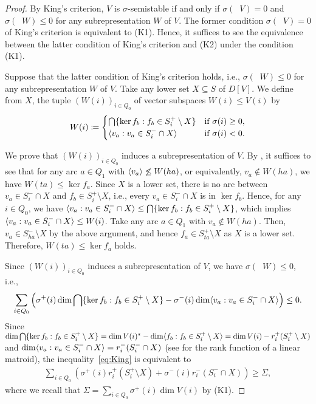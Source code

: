 \documentclass[a4paper,11pt]{article}
\numberwithin{equation}{section}
\DeclareMathOperator{\dimv}{\underline{dim}}
\DeclarePairedDelimiter{\spnn}{\langle}{\rangle}
\begin{document}
\begin{proof}
By King's criterion,
$V$ is $\sigma$-semistable if and only if
$\sigma (\dimv V) = 0$ and $\sigma (\dimv W) \leq 0$ for any subrepresentation $W$ of $V$.
The former condition $\sigma (\dimv V) = 0$ of King's criterion is equivalent to (K1).
Hence, it suffices to see the equivalence between
the latter condition of King's criterion and (K2)
under the condition (K1).

Suppose that the latter condition of King's criterion holds, i.e., $\sigma (\dimv W) \leq 0$ for any subrepresentation $W$ of $V$.
Take any lower set $X \subseteq S$ of $D[V]$.
We define from $X$, the tuple $(W(i))_{i \in Q_0}$ of vector subspaces $W(i) \leq V(i)$ by
\begin{align}
    W(i) \coloneqq
    \begin{cases}
        \bigcap \{ \ker f_b : f_b \in S_i^+ \setminus X \} & \text{if $\sigma(i) \geq 0$},\\
        \spnn{v_a : v_a \in S_i^- \cap X} & \text{if $\sigma(i) < 0$}.
    \end{cases}
\end{align}

We prove that $(W(i))_{i \in Q_0}$ induces a subrepresentation of $V$.
By ,
it suffices to see that for any arc $a \in Q_1$ with $\spnn{v_a} \not\leq W(ha)$, or equivalently, $v_a \notin W(ha)$,
we have $W(ta) \leq \ker f_a$.
Since $X$ is a lower set,
there is no arc between $v_a \in S_i^- \cap X$ and $f_b \in S_i^+ \setminus X$,
i.e., every $v_a \in S_i^- \cap X$ is in $\ker f_b$.
Hence, for any $i \in Q_0$, we have $\spnn{v_a : v_a \in S_i^- \cap X} \leq \bigcap \{ \ker f_b : f_b \in S_i^+ \setminus X \}$,
which implies $\spnn{v_a : v_a \in S_i^- \cap X} \leq W(i)$.
Take any arc $a \in Q_1$ with $v_a \notin W(ha)$.
Then, $v_a \in S_{ha}^- \setminus X$ by the above argument,
and hence $f_a \in S_{ta}^+ \setminus X$ as $X$ is a lower set.
Therefore, $W(ta) \leq \ker f_a$ holds.

Since $(W(i))_{i \in Q_0}$ induces a subrepresentation of $V$,
we have $\sigma(\dimv W) \leq 0$,
i.e.,
\begin{align}\label{eq:King}
    \sum_{i \in Q_0} \left( \sigma^+(i) \dim \bigcap \{ \ker f_b : f_b \in S_i^+ \setminus X \} - \sigma^-(i) \dim \spnn{v_a : v_a \in S_i^- \cap X} \right) \leq 0.
\end{align}
Since
$\dim \bigcap \{ \ker f_b : f_b \in S_i^+ \setminus X \} = \dim V(i)^* - \dim \spnn{f_b : f_b \in S_i^+ \setminus X} = \dim V(i) - r_i^+(S_i^+ \setminus X)$
and $\dim \spnn{v_a : v_a \in S_i^- \cap X} = r_i^-(S_i^- \cap X)$ (see  for the rank function of a linear matroid),
the inequality~\eqref{eq:King} is equivalent to
\begin{align}\label{eq:K2}
    \sum_{i \in Q_0}\left( \sigma^+(i) r_i^+(S_i^+ \setminus X) + \sigma^-(i) r_i^-(S_i^- \cap X) \right) \geq \Sigma,
\end{align}
where we recall that $\Sigma = \sum_{i \in Q_0} \sigma^+(i) \dim V(i)$ by (K1).



\end{proof}
\end{document}
